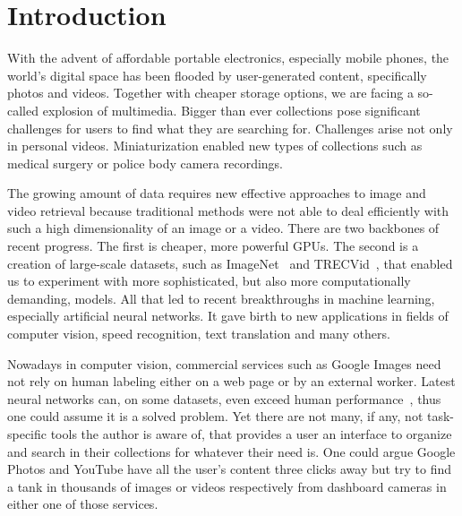 \chapter*{Introduction}


With the advent of affordable portable electronics, especially mobile phones, the world's digital space has been flooded by user-generated content, specifically photos and videos. Together with cheaper storage options, we are facing a so-called explosion of multimedia. Bigger than ever collections pose significant challenges for users to find what they are searching for. Challenges arise not only in personal videos. Miniaturization enabled new types of collections such as medical surgery or police body camera recordings.

The growing amount of data requires new effective approaches to image and video retrieval because traditional methods were not able to deal efficiently with such a high dimensionality of an image or a video. There are two backbones of recent progress. The first is cheaper, more powerful GPUs. The second is a creation of large-scale datasets, such as ImageNet~\cite{ILSVRC15} and TRECVid~\cite{2017trecvidawad}, that enabled us to experiment with more sophisticated, but also more computationally demanding, models. All that led to recent breakthroughs in machine learning, especially artificial neural networks. It gave birth to new applications in fields of computer vision, speed recognition, text translation and many others.

Nowadays in computer vision, commercial services such as Google Images need not rely on human labeling either on a web page or by an external worker. Latest neural networks can, on some datasets, even exceed human performance~\cite{he2015delving}, thus one could assume it is a solved problem. Yet there are not many, if any, not task-specific tools the author is aware of, that provides a user an interface to organize and search in their collections for whatever their need is. One could argue Google Photos and YouTube have all the user's content three clicks away but try to find a tank in thousands of images or videos respectively from dashboard cameras in either one of those services.

